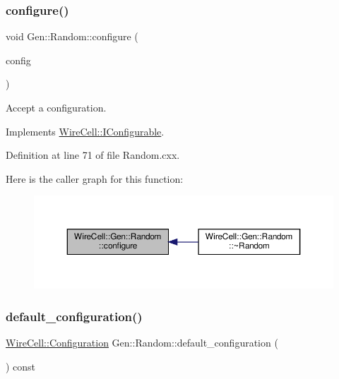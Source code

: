 \subsubsection{\texorpdfstring{configure()}{configure()}}
{\footnotesize\ttfamily void Gen\+::\+Random\+::configure (\begin{DoxyParamCaption}\item[{const \hyperlink{namespace_wire_cell_a9f705541fc1d46c608b3d32c182333ee}{Wire\+Cell\+::\+Configuration} \&}]{config }\end{DoxyParamCaption})\hspace{0.3cm}{\ttfamily [virtual]}}



Accept a configuration. 



Implements \hyperlink{class_wire_cell_1_1_i_configurable_a57ff687923a724093df3de59c6ff237d}{Wire\+Cell\+::\+I\+Configurable}.



Definition at line 71 of file Random.\+cxx.

Here is the caller graph for this function\+:
\nopagebreak
\begin{figure}[H]
\begin{center}
\leavevmode
\includegraphics[width=350pt]{class_wire_cell_1_1_gen_1_1_random_ae62de2bc5ed1078fb4f24a7dd0e9bae9_icgraph}
\end{center}
\end{figure}
\mbox{\label{class_wire_cell_1_1_gen_1_1_random_a52d481cf1def8ba466faa65fc20529ef}} 
\subsubsection{\texorpdfstring{default\+\_\+configuration()}{default\_configuration()}}
{\footnotesize\ttfamily \hyperlink{namespace_wire_cell_a9f705541fc1d46c608b3d32c182333ee}{Wire\+Cell\+::\+Configuration} Gen\+::\+Random\+::default\+\_\+configuration (\begin{DoxyParamCaption}{ }\end{DoxyParamCaption}) const\hspace{0.3cm}{\ttfamily [virtual]}}



